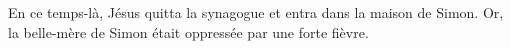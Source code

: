 En ce temps-là, Jésus quitta la synagogue et entra dans la maison de Simon.
	Or, la belle-mère de Simon était oppressée par une forte fièvre.
